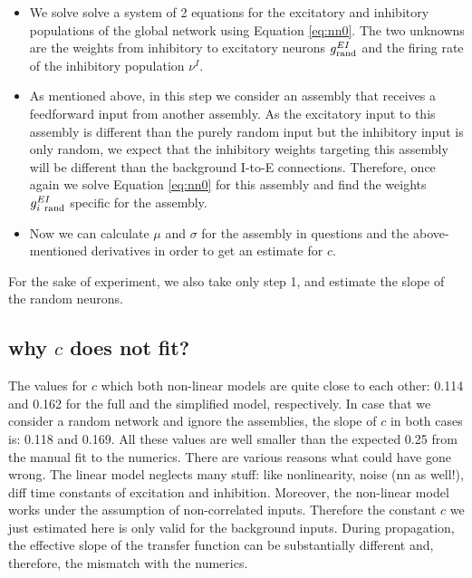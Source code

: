 \begin{itemize}
  \item We solve solve a system of 2 equations for the excitatory and inhibitory populations of the global network using Equation \ref{eq:nn0}.
    The two unknowns are the weights from inhibitory to excitatory neurons $g^{EI}_{\rm rand}$ and the firing rate of the inhibitory population $\nu^I$.
  \item As mentioned above, in this step we consider an assembly that receives a feedforward input from another assembly.
    As the excitatory input to this assembly is different than the purely random input but the inhibitory input is only random, we expect that the inhibitory weights targeting this assembly will be different than the background I-to-E connections.
    Therefore, once again we solve Equation \ref{eq:nn0} for this assembly and find the weights $g^{EI}_{i~\rm rand}$ specific for the assembly.
  \item Now we can calculate $\mu$ and $\sigma$ for the assembly in questions and the above-mentioned derivatives in order to get an estimate for $c$.

\end{itemize}

For the sake of experiment, we also take only step 1, and estimate the slope of the random neurons.


\subsection{why $c$ does not fit?}
The values for $c$ which both non-linear models are quite close to each other: 0.114 and 0.162 for the full and the simplified model, respectively.
In case that we consider a random network and ignore the assemblies, the slope of $c$ in both cases is: 0.118 and 0.169.
All these values are well smaller than the expected 0.25 from the manual fit to the numerics.
There are various reasons what could have gone wrong.
The linear model neglects many stuff: like nonlinearity, noise (nn as well!), diff time constants of excitation and inhibition.
Moreover, the non-linear model works under the assumption of non-correlated inputs.
Therefore the constant $c$ we just estimated here is only valid for the background inputs.
During propagation, the effective slope of the transfer function can be substantially different and, therefore, the mismatch with the numerics.














